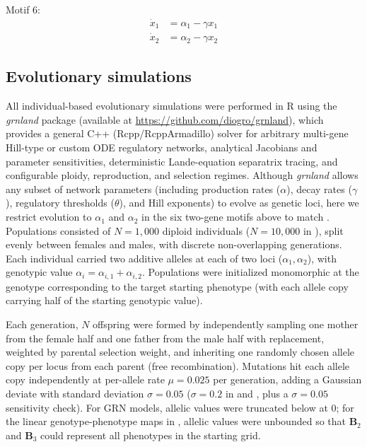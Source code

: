 Motif 6:
\begin{equation}
\begin{aligned}
\dot{x}_1 &= \alpha_1 - \gamma x_1\\
\dot{x}_2 &= \alpha_2 - \gamma x_2
\end{aligned}
\end{equation}

\subsection{Evolutionary simulations}

All individual-based evolutionary simulations were performed in R using the \textit{grnland} package (available at \url{https://github.com/diogro/grnland}), which provides a general C++ (Rcpp/RcppArmadillo) solver for arbitrary multi-gene Hill-type or custom ODE regulatory networks, analytical Jacobians and parameter sensitivities, deterministic Lande-equation separatrix tracing, and configurable ploidy, reproduction, and selection regimes.
Although \textit{grnland} allows any subset of network parameters (including production rates ($\alpha$), decay rates ($\gamma$), regulatory thresholds ($\theta$), and Hill exponents) to evolve as genetic loci, here we restrict evolution to $\alpha_1$ and $\alpha_2$ in the six two-gene motifs above to match \cite{hether2014genetic}.
Populations consisted of $N = 1{,}000$ diploid individuals ($N = 10{,}000$ in ), split evenly between females and males, with discrete non-overlapping generations.
Each individual carried two additive alleles at each of two loci ($\alpha_1, \alpha_2$), with genotypic value $\alpha_i = \alpha_{i,1} + \alpha_{i,2}$.
Populations were initialized monomorphic at the genotype corresponding to the target starting phenotype (with each allele copy carrying half of the starting genotypic value).

Each generation, $N$ offspring were formed by independently sampling one mother from the female half and one father from the male half with replacement, weighted by parental selection weight, and inheriting one randomly chosen allele copy per locus from each parent (free recombination).
Mutations hit each allele copy independently at per-allele rate $\mu = 0.025$ per generation, adding a Gaussian deviate with standard deviation $\sigma = 0.05$ ($\sigma = 0.2$ in  and , plus a $\sigma = 0.05$ sensitivity check).
For GRN models, allelic values were truncated below at $0$; for the linear genotype-phenotype maps in , allelic values were unbounded so that $\mathbf{B}_2$ and $\mathbf{B}_3$ could represent all phenotypes in the starting grid.

